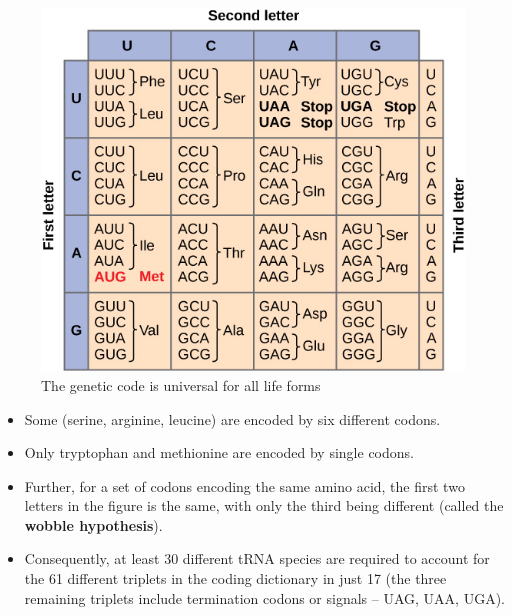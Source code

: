 \documentclass[11pt,ignorenonframetext,aspectratio=169]{beamer}
\providecommand{\tightlist}{%
  \setlength{\itemsep}{0pt}\setlength{\parskip}{0pt}}
\begin{document}
\begin{frame}{}
\protect\hypertarget{section-13}{}

\begin{figure}
\includegraphics[width=0.45\linewidth]{./../images/nucleotide_codons} \caption{The genetic code is universal for all life forms}\label{fig:universality}
\end{figure}

\end{frame}

\begin{frame}{}
\protect\hypertarget{section-14}{}

\begin{itemize}
\tightlist
\item
  Some (serine, arginine, leucine) are encoded by six different codons.
\item
  Only tryptophan and methionine are encoded by single codons.
\item
  Further, for a set of codons encoding the same amino acid, the first
  two letters in the figure is the same, with only the third being
  different (called the \textbf{wobble hypothesis}).
\item
  Consequently, at least 30 different tRNA species are required to
  account for the 61 different triplets in the coding dictionary in just
  17 (the three remaining triplets include termination codons or signals
  -- UAG, UAA, UGA).
\end{itemize}

\end{frame}
\end{document}
